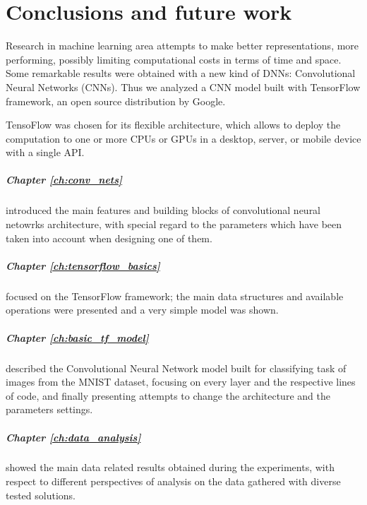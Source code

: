 \chapter{Conclusions and future work}\label{ch:conclusions}

Research in machine learning area attempts to make better representations, more performing, possibly limiting computational costs in terms of time and space. Some remarkable results were obtained with a new kind of \acsp{DNN}: Convolutional Neural Networks (\acsp{CNN}). Thus we analyzed a \acs{CNN} model built with TensorFlow framework, an open source distribution by Google.

TensoFlow was chosen for its flexible architecture, which allows to deploy the computation to one or more \acsp{CPU} or \acsp{GPU} in a desktop, server, or mobile device with a single API.

\paragraph{Chapter \ref{ch:conv_nets}} introduced the main features and building blocks of convolutional neural netowrks architecture, with special regard to the parameters which have been taken into account when designing one of them.

\paragraph{Chapter \ref{ch:tensorflow_basics}} focused on the TensorFlow framework; the main data structures and available operations were presented and a very simple model was shown.

\paragraph{Chapter \ref{ch:basic_tf_model}} described the Convolutional Neural Network model built for classifying task of images from the \acs{MNIST} dataset, focusing on every layer and the respective lines of code, and finally presenting attempts to change the architecture and the parameters settings.

\paragraph{Chapter \ref{ch:data_analysis}} showed the main data related results obtained during the experiments, with respect to different perspectives of analysis on the data gathered with diverse tested solutions.

